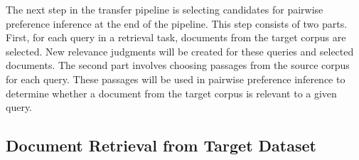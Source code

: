 The next step in the transfer pipeline is selecting candidates for pairwise preference inference at the end of the pipeline. This step consists of two parts. First, for each query in a retrieval task, documents from the target corpus are selected. New relevance judgments will be created for these queries and selected documents. The second part involves choosing passages from the source corpus for each query. These passages will be used in pairwise preference inference to determine whether a document from the target corpus is relevant to a given query.

\subsection{Document Retrieval from Target Dataset}\label{document-retrieval-from-target-dataset}

